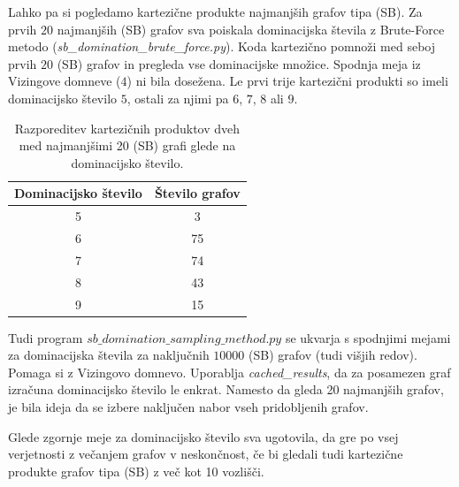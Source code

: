 \documentclass{article}
\begin{document}
Lahko pa si pogledamo kartezične produkte najmanjših grafov tipa (SB). Za prvih $20$ najmanjših (SB) grafov sva poiskala dominacijska števila z Brute-Force metodo (\textit{sb\_domination\_brute\_force.py}). 
Koda kartezično pomnoži med seboj prvih $20$ (SB) grafov in pregleda vse dominacijske množice.
Spodnja meja iz Vizingove domneve ($4$) ni bila dosežena. Le prvi trije kartezični produkti so imeli dominacijsko število 
$5$, ostali za njimi pa $6$, $7$, $8$ ali $9$. 

\begin{table}[h!]
    \centering
    \begin{tabular}{|c|c|}
        \hline
        Dominacijsko število & Število grafov \\ \hline
        5 & 3 \\ \hline
        6 & 75 \\ \hline
        7 & 74 \\ \hline
        8 & 43 \\ \hline
        9 & 15 \\ \hline
    \end{tabular}
    \caption{Razporeditev kartezičnih produktov dveh med najmanjšimi 20 (SB) grafi glede na dominacijsko število.}
    
\end{table}

Tudi program $sb\_domination\_sampling\_method.py$ se ukvarja s spodnjimi mejami za dominacijska števila za naključnih $10000$ (SB) grafov (tudi višjih 
redov). Pomaga si z Vizingovo domnevo. Uporablja \textit{cached\_results}, da za posamezen graf izračuna dominacijsko število le enkrat. Namesto da gleda 20 najmanjših grafov, je bila ideja da se izbere naključen nabor vseh pridobljenih grafov.

Glede zgornje meje za dominacijsko število sva ugotovila, da gre po vsej verjetnosti z večanjem grafov v 
neskončnost, če bi gledali tudi kartezične produkte grafov tipa (SB) z več kot 10 vozlišči.
\end{document}
